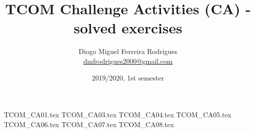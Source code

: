 \documentclass{tcom}
\title{TCOM Challenge Activities (CA) - solved exercises}
\author{Diogo Miguel Ferreira Rodrigues \\ \href{mailto:dmfrodrigues2000@gmail.com}{dmfrodrigues2000@gmail.com}}
\date{2019/2020, 1st semester}
\begin{document}
\begingroup
	\maketitle
	\let\clearpage\relax
	\setcounter{tocdepth}{2}
	\tableofcontents
\endgroup
{TCOM_CA01.tex}
{TCOM_CA03.tex}
{TCOM_CA04.tex}
{TCOM_CA05.tex}
{TCOM_CA06.tex}
{TCOM_CA07.tex}
{TCOM_CA08.tex}
\end{document}
